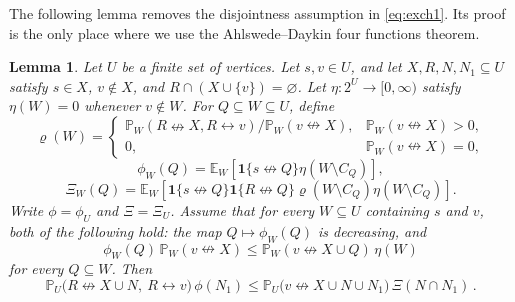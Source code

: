 \documentclass[11pt]{article}
\newtheorem{lemma}[theorem]{Lemma}
\theoremstyle{definition}
\theoremstyle{remark}
\newcommand{\PP}{\mathbb P}
\newcommand{\EE}{\mathbb E}
\newcommand{\one}{\mathbf 1}
\newcommand{\con}{\leftrightarrow}
\newcommand{\ncon}{\nleftrightarrow}
\begin{document}
The following lemma removes the disjointness assumption in \eqref{eq:exch1}. Its proof is
the only place where we use the Ahlswede--Daykin four functions theorem.

\begin{lemma}\label{lem:overlapavoid}
Let $U$ be a finite set of vertices. Let $s,v\in U$, and let $X,R,N,N_1\subseteq U$ satisfy
$s\in X$, $v\notin X$, and $R\cap(X\cup\{v\})=\varnothing$. Let
$\eta:2^U\to[0,\infty)$ satisfy $\eta(W)=0$ whenever $v\notin W$. For
$Q\subseteq W\subseteq U$, define
\[
 \varrho(W)=
 \begin{cases}
 \PP_W(R\ncon X,R\con v)/\PP_W(v\ncon X),&\PP_W(v\ncon X)>0,\\
 0,&\PP_W(v\ncon X)=0,
 \end{cases}
\]
\[
 \phi_W(Q)=\EE_W[\one\{s\ncon Q\}\eta(W\setminus C_Q)],
\]
\[
 \Xi_W(Q)=\EE_W[\one\{s\ncon Q\}\one\{R\ncon Q\}
 \varrho(W\setminus C_Q)\eta(W\setminus C_Q)].
\]
Write $\phi=\phi_U$ and $\Xi=\Xi_U$. Assume that for every $W\subseteq U$ containing $s$
and $v$, both of the following hold: the map $Q\mapsto\phi_W(Q)$ is decreasing, and
\begin{equation}\label{eq:stopped-general}
 \phi_W(Q)\,\PP_W(v\ncon X)
 \leq \PP_W(v\ncon X\cup Q)\,\eta(W)
\end{equation}
for every $Q\subseteq W$. Then
\begin{equation}\label{eq:twosource}
 \PP_U\bigl(R\ncon X\cup N,\ R\con v\bigr)\,\phi(N_1)
 \leq \PP_U\bigl(v\ncon X\cup N\cup N_1\bigr)\,\Xi(N\cap N_1)\,.
\end{equation}
\end{lemma}
\end{document}
